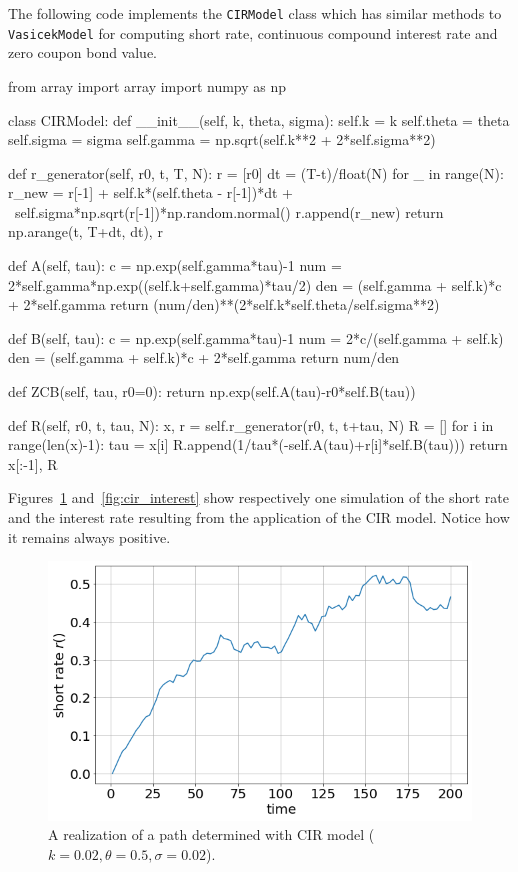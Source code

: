 The following code implements the \texttt{CIRModel} class which has similar methods to \texttt{VasicekModel} for computing short rate, continuous compound interest rate and zero coupon bond value.

\begin{ipython}
from array import array
import numpy as np

class CIRModel:
    def __init__(self, k, theta, sigma):
        self.k = k
        self.theta = theta
        self.sigma = sigma
        self.gamma = np.sqrt(self.k**2 + 2*self.sigma**2)

    def r_generator(self, r0, t, T, N):
        r = [r0]
        dt = (T-t)/float(N)
        for _ in range(N):
            r_new = r[-1] + self.k*(self.theta - r[-1])*dt + \
                    self.sigma*np.sqrt(r[-1])*np.random.normal()
            r.append(r_new)
        return np.arange(t, T+dt, dt), r

    def A(self, tau):
        c = np.exp(self.gamma*tau)-1
        num = 2*self.gamma*np.exp((self.k+self.gamma)*tau/2)
        den = (self.gamma + self.k)*c + 2*self.gamma
        return (num/den)**(2*self.k*self.theta/self.sigma**2)

    def B(self, tau):
        c = np.exp(self.gamma*tau)-1
        num = 2*c/(self.gamma + self.k)
        den = (self.gamma + self.k)*c + 2*self.gamma
        return num/den

    def ZCB(self, tau, r0=0):
        return np.exp(self.A(tau)-r0*self.B(tau))

    def R(self, r0, t, tau, N):
        x, r = self.r_generator(r0, t, t+tau, N)
        R = []
        for i in range(len(x)-1):
            tau = x[i]
            R.append(1/tau*(-self.A(tau)+r[i]*self.B(tau)))
        return x[:-1], R
\end{ipython}

Figures~\ref{fig:cir_path} and~\ref{fig:cir_interest} show respectively one simulation of the short rate and the interest rate resulting from the application of the CIR model. Notice how it remains always positive.

\begin{figure}[htb]
	\centering
	\includegraphics[width=0.7\linewidth]{figures/cir_short_rate}
	\caption{A realization of a path determined with CIR model ($k=0.02, \theta=0.5, \sigma=0.02$).}
	\label{fig:cir_path}
\end{figure}

